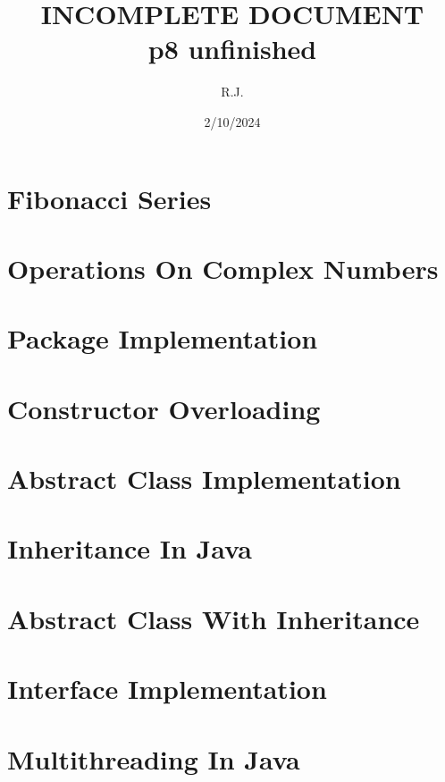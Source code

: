 \documentclass{article}
\title{%
  INCOMPLETE DOCUMENT \\
  \large p8 unfinished 
}
\author{R.J.}
\date{2/10/2024}
\begin{document}
\maketitle
\newpage

\tableofcontents
\newpage

\section{Fibonacci Series}

\newpage

\section{Operations On Complex Numbers}

\newpage

\section{Package Implementation}

\newpage

\section{Constructor Overloading}

\newpage

\section{Abstract Class Implementation}

\newpage

\section{Inheritance In Java}


\section{Abstract Class With Inheritance}

\newpage

\section{Interface Implementation}

\newpage

\section{Multithreading In Java}

\newpage
\end{document}
